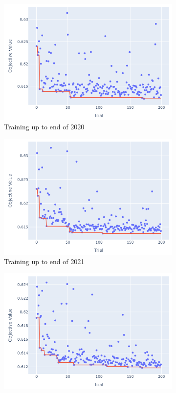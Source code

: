 \documentclass[12pt,twoside]{report}
\begin{document}
\begin{figure}[htb]
\begin{subfigure}{.33\linewidth}
  \includegraphics[width=0.95\linewidth]{figures/va_lightgbm_no_odds_cutoff_2020.png}
  \caption{Training up to end of 2020}
\end{subfigure}%
\begin{subfigure}{.33\linewidth}
  \centering
  \includegraphics[width=0.95\linewidth]{figures/va_lightgbm_no_odds_cutoff_2021.png}
  \caption{Training up to end of 2021}
\end{subfigure}
\par\bigskip
\par\bigskip
\begin{subfigure}{.33\linewidth}
  \centering
  \includegraphics[width=0.95\linewidth]{figures/va_lightgbm_no_odds_cutoff_2022.png}

\end{subfigure}
\end{figure}
\end{document}
